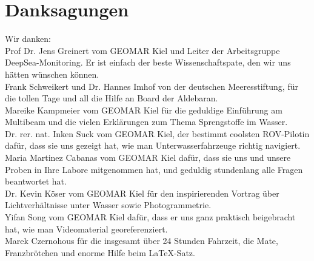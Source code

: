  

\chapter[Danksagungen]{Danksagungen}
Wir danken:\\


Prof Dr. Jens Greinert vom GEOMAR Kiel und Leiter der Arbeitsgruppe DeepSea-Monitoring. Er ist einfach der beste Wissenschaftspate, den wir uns hätten wünschen können.\\



Frank Schweikert und Dr. Hannes Imhof von der deutschen Meeresstiftung, für die tollen Tage und all die Hilfe an Board der Aldebaran. \\



Mareike Kampmeier vom GEOMAR Kiel für die geduldige Einführung am Multibeam und die vielen Erklärungen zum Thema Sprengstoffe im Wasser. \\



Dr. rer. nat. Inken Suck vom GEOMAR Kiel, der bestimmt coolsten ROV-Pilotin dafür, dass sie uns gezeigt hat, wie man Unterwasserfahrzeuge richtig navigiert. \\



Maria Martinez Cabanas vom GEOMAR Kiel dafür, dass sie uns und unsere Proben in Ihre Labore mitgenommen hat, und geduldig stundenlang alle Fragen beantwortet hat.\\



Dr. Kevin Köser vom GEOMAR Kiel für den inspirierenden Vortrag über Lichtverhältnisse unter Wasser sowie Photogrammetrie. \\



Yifan Song vom GEOMAR Kiel dafür, dass er uns ganz praktisch beigebracht hat, wie man Videomaterial georeferenziert.\\



Marek Czernohous für die insgesamt über 24 Stunden Fahrzeit, die Mate, Franzbrötchen und enorme Hilfe beim \LaTeX -Satz.\\
